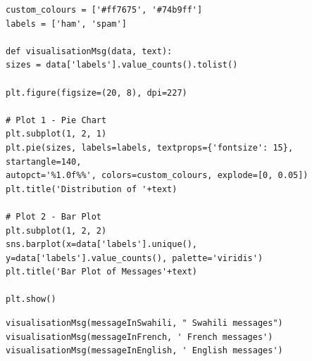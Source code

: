 \documentclass[12pt,a4paper, oneside]{book}
\begin{document}
\begin{lstlisting}[style=stylejupyter]
custom_colours = ['#ff7675', '#74b9ff']
labels = ['ham', 'spam']

def visualisationMsg(data, text):
sizes = data['labels'].value_counts().tolist()

plt.figure(figsize=(20, 8), dpi=227)

# Plot 1 - Pie Chart
plt.subplot(1, 2, 1)
plt.pie(sizes, labels=labels, textprops={'fontsize': 15}, startangle=140, 
autopct='%1.0f%%', colors=custom_colours, explode=[0, 0.05])
plt.title('Distribution of '+text)

# Plot 2 - Bar Plot
plt.subplot(1, 2, 2)
sns.barplot(x=data['labels'].unique(), y=data['labels'].value_counts(), palette='viridis')
plt.title('Bar Plot of Messages'+text)

plt.show() 
\end{lstlisting} 
\begin{lstlisting}[style=stylejupyter]
visualisationMsg(messageInSwahili, " Swahili messages") 
visualisationMsg(messageInFrench, ' French messages')  
visualisationMsg(messageInEnglish, ' English messages')
\end{lstlisting} 
\end{document}
